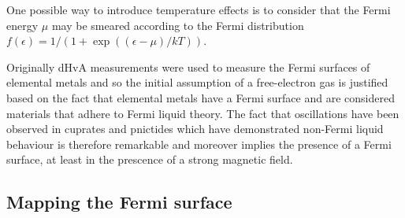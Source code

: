One possible way to introduce temperature effects is to consider that the Fermi energy $\mu$ may be smeared according to the Fermi distribution $f(\epsilon) = 1/(1+\exp((\epsilon-\mu)/kT))$.





Originally \ac{dHvA} measurements were used to measure the Fermi surfaces of elemental metals and so the initial assumption of a free-electron gas is justified based on the fact that elemental metals have a Fermi surface and are considered materials that adhere to Fermi liquid theory. The fact that oscillations have been observed in cuprates and pnictides which have demonstrated non-Fermi liquid behaviour is therefore remarkable and moreover implies the presence of a Fermi surface, at least in the prescence of a strong magnetic field.



\subsection{Mapping the Fermi surface}

